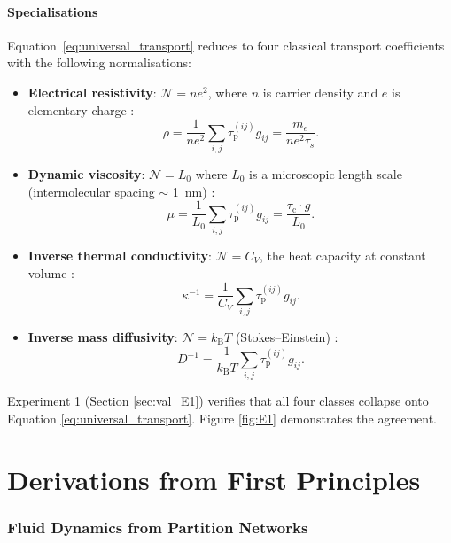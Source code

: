 \documentclass[twocolumn,10pt,a4paper]{article}
\theoremstyle{definition}
\theoremstyle{remark}
\newcommand{\kB}{k_{\mathrm{B}}}
\newcommand{\tauP}{\tau_{\mathrm{p}}}
\newcommand{\tauC}{\tau_{\mathrm{c}}}
\newcommand{\Norm}{\mathcal{N}}
\begin{document}
\subsection{Specialisations}

Equation~\eqref{eq:universal_transport} reduces to four classical transport coefficients with the following normalisations:

\begin{itemize}[leftmargin=1.2em,nosep]
\item \textbf{Electrical resistivity}: $\Norm = ne^2$, where $n$ is carrier density and $e$ is elementary charge \citep{drude1900a,sommerfeld1928}:
\[
\rho = \frac{1}{ne^2}\sum_{i,j} \tauP^{(ij)} g_{ij} = \frac{m_e}{ne^2 \tau_s}.
\]
\item \textbf{Dynamic viscosity}: $\Norm = L_0$ where $L_0$ is a microscopic length scale (intermolecular spacing $\sim$ 1~nm) \citep{chapman1990,landau1987fluid}:
\[
\mu = \frac{1}{L_0}\sum_{i,j} \tauP^{(ij)} g_{ij} = \frac{\tauC \cdot g}{L_0}.
\]
\item \textbf{Inverse thermal conductivity}: $\Norm = C_V$, the heat capacity at constant volume \citep{ashcroft1976}:
\[
\kappa^{-1} = \frac{1}{C_V}\sum_{i,j} \tauP^{(ij)} g_{ij}.
\]
\item \textbf{Inverse mass diffusivity}: $\Norm = \kB T$ (Stokes--Einstein) \citep{einstein1905brownian}:
\[
D^{-1} = \frac{1}{\kB T}\sum_{i,j} \tauP^{(ij)} g_{ij}.
\]
\end{itemize}

Experiment 1 (Section \ref{sec:val_E1}) verifies that all four classes collapse onto Equation \eqref{eq:universal_transport}. Figure \ref{fig:E1} demonstrates the agreement.



\part{Derivations from First Principles}

\section{Fluid Dynamics from Partition Networks}
\label{sec:fluids}
\end{document}
